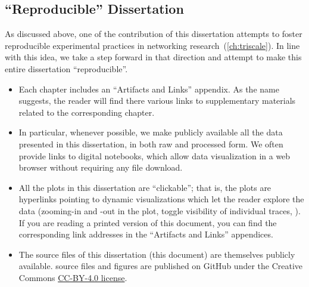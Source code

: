 \begin{subappendices}

\newpage
\section{``Reproducible'' Dissertation}

As discussed above, one of the contribution of this dissertation attempts to foster reproducible experimental practices in networking research~(\cref{ch:triscale}).
In line with this idea, we take a step forward in that direction and attempt to make this entire dissertation ``reproducible''.

\begin{itemize}

	\item
	Each chapter includes an ``Artifacts and Links'' appendix. As the name suggests, the reader will find there various links to supplementary materials related to the corresponding chapter.

	\item
	In particular, whenever possible, we make publicly available all the data presented in this dissertation, in both raw and processed form.
	We often provide links to digital notebooks, which allow data visualization in a web browser without requiring any file download.

	\item
	All the plots in this dissertation are ``clickable''; that is, the plots are hyperlinks pointing to dynamic visualizations which let the reader explore the data (\eg zooming-in and -out in the plot, toggle visibility of individual traces, \etc).
	If you are reading a printed version of this document, you can find the corresponding link addresses in the ``Artifacts and Links'' appendices.

	\item
	The source files of this dissertation (this document) are themselves publicly available.
	\tex source files and figures are published on GitHub under the Creative Commons \href{https://creativecommons.org/licenses/by/4.0/}{CC-BY-4.0 license}.

\end{itemize}


\end{subappendices}
